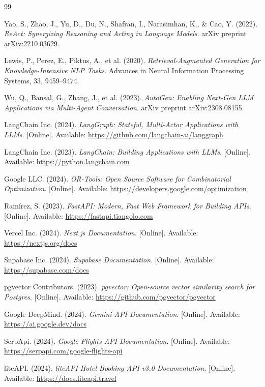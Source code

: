 \documentclass[12pt, a4paper]{article}
\begin{document}
\begin{thebibliography}{99}

Yao, S., Zhao, J., Yu, D., Du, N., Shafran, I., Narasimhan, K., \& Cao, Y. (2022).
\textit{ReAct: Synergizing Reasoning and Acting in Language Models}.
arXiv preprint arXiv:2210.03629.

Lewis, P., Perez, E., Piktus, A., et al. (2020).
\textit{Retrieval-Augmented Generation for Knowledge-Intensive NLP Tasks}.
Advances in Neural Information Processing Systems, 33, 9459--9474.

Wu, Q., Bansal, G., Zhang, J., et al. (2023).
\textit{AutoGen: Enabling Next-Gen LLM Applications via Multi-Agent Conversation}.
arXiv preprint arXiv:2308.08155.

LangChain Inc. (2024).
\textit{LangGraph: Stateful, Multi-Actor Applications with LLMs}.
[Online]. Available: \url{https://github.com/langchain-ai/langgraph}

LangChain Inc. (2023).
\textit{LangChain: Building Applications with LLMs}.
[Online]. Available: \url{https://python.langchain.com}

Google LLC. (2024).
\textit{OR-Tools: Open Source Software for Combinatorial Optimization}.
[Online]. Available: \url{https://developers.google.com/optimization}

Ram\'{i}rez, S. (2023).
\textit{FastAPI: Modern, Fast Web Framework for Building APIs}.
[Online]. Available: \url{https://fastapi.tiangolo.com}

Vercel Inc. (2024).
\textit{Next.js Documentation}.
[Online]. Available: \url{https://nextjs.org/docs}

Supabase Inc. (2024).
\textit{Supabase Documentation}.
[Online]. Available: \url{https://supabase.com/docs}

pgvector Contributors. (2023).
\textit{pgvector: Open-source vector similarity search for Postgres}.
[Online]. Available: \url{https://github.com/pgvector/pgvector}

Google DeepMind. (2024).
\textit{Gemini API Documentation}.
[Online]. Available: \url{https://ai.google.dev/docs}

SerpApi. (2024).
\textit{Google Flights API Documentation}.
[Online]. Available: \url{https://serpapi.com/google-flights-api}

liteAPI. (2024).
\textit{liteAPI Hotel Booking API v3.0 Documentation}.
[Online]. Available: \url{https://docs.liteapi.travel}


\end{thebibliography}
\end{document}
